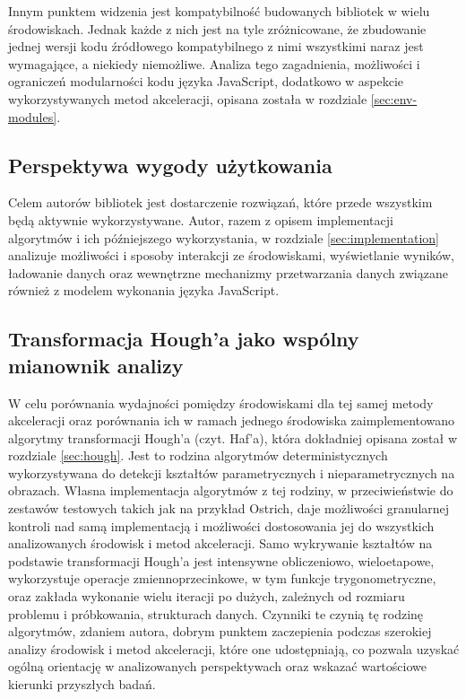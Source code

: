 Innym punktem widzenia jest kompatybilność budowanych bibliotek w wielu środowiskach. Jednak każde z nich jest na tyle zróżnicowane, że zbudowanie jednej wersji kodu źródłowego kompatybilnego z nimi wszystkimi naraz jest wymagające, a niekiedy niemożliwe. Analiza tego zagadnienia, możliwości i ograniczeń modularności kodu języka JavaScript, dodatkowo w aspekcie wykorzystywanych metod akceleracji, opisana została w rozdziale \ref{sec:env-modules}.

\subsection{Perspektywa wygody użytkowania}

Celem autorów bibliotek jest dostarczenie rozwiązań, które przede wszystkim będą aktywnie wykorzystywane. Autor, razem z opisem implementacji algorytmów i ich późniejszego wykorzystania, w rozdziale \ref{sec:implementation} analizuje możliwości i sposoby interakcji ze środowiskami, wyświetlanie wyników, ładowanie danych oraz wewnętrzne mechanizmy przetwarzania danych związane również z modelem wykonania języka JavaScript.

\subsection{Transformacja Hough'a jako wspólny mianownik analizy}

W celu porównania wydajności pomiędzy środowiskami dla tej samej metody akceleracji oraz porównania ich w ramach jednego środowiska zaimplementowano algorytmy transformacji Hough'a (czyt. Haf'a), która dokładniej opisana został w rozdziale \ref{sec:hough}. Jest to rodzina algorytmów deterministycznych wykorzystywana do detekcji kształtów parametrycznych i nieparametrycznych na obrazach.  Własna implementacja algorytmów z tej rodziny, w przeciwieństwie do zestawów testowych takich jak na przykład Ostrich\cite{ostrich}, daje możliwości granularnej kontroli nad samą implementacją i możliwości dostosowania jej do wszystkich analizowanych środowisk i metod akceleracji. Samo wykrywanie kształtów na podstawie transformacji Hough'a jest intensywne obliczeniowo, wieloetapowe, wykorzystuje operacje zmiennoprzecinkowe, w tym funkcje trygonometryczne, oraz zakłada wykonanie wielu iteracji po dużych, zależnych od rozmiaru problemu i próbkowania, strukturach danych. Czynniki te czynią tę rodzinę algorytmów, zdaniem autora, dobrym punktem zaczepienia podczas szerokiej analizy środowisk i metod akceleracji, które one udostępniają, co pozwala uzyskać ogólną orientację w analizowanych perspektywach oraz wskazać wartościowe kierunki przyszłych badań. 

